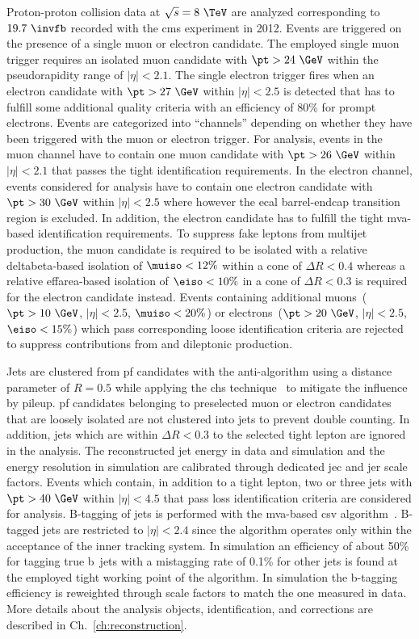 Proton-proton collision data at $\sqrt{s}=8~\TeV$ are analyzed corresponding to $19.7~\invfb$ recorded with the \gls{cms} experiment in 2012. Events are triggered on the presence of a single muon or electron candidate. The employed single muon trigger requires an isolated muon candidate with $\pt>24~\GeV$ within the pseudorapidity range of $|\eta|<2.1$. The single electron trigger fires when an electron candidate with $\pt>27~\GeV$ within $|\eta|<2.5$ is detected that has to fulfill some additional quality criteria with an efficiency of 80\% for prompt electrons. Events are categorized into ``channels'' depending on whether they have been triggered with the muon or electron trigger. For analysis, events in the muon channel have to contain one muon candidate with $\pt>26~\GeV$ within $|\eta|<2.1$ that passes the tight identification requirements. In the electron channel, events considered for analysis have to contain one electron candidate with $\pt>30~\GeV$ within $|\eta|<2.5$ where however the \gls{ecal} barrel-endcap transition region is excluded. In addition, the electron candidate has to fulfill the tight \gls{mva}-based identification requirements. To suppress fake leptons from multijet production, the muon candidate is required to be isolated with a relative \gls{deltabeta}-based isolation of $\muiso<12\%$ within a cone of $\Delta R<0.4$ whereas a relative \gls{effarea}-based isolation of $\eiso<10\%$ in a cone of $\Delta R <0.3$ is required for the electron candidate instead. Events containing additional muons~($\pt>10~\GeV$, $|\eta|<2.5$, $\muiso<20\%$) or electrons~($\pt>20~\GeV$, $|\eta|<2.5$, $\eiso<15\%$) which pass corresponding loose identification criteria are rejected to suppress contributions from \zjets and dileptonic \ttbar production. 

Jets are clustered from \gls{pf} candidates with the anti-\kt algorithm using a distance parameter of $R=0.5$ while applying the \gls{chs} technique~\cite{CMS-PAS-JME-14-001} to mitigate the influence by pileup. \gls{pf} candidates belonging to preselected muon or electron candidates that are loosely isolated are not clustered into jets to prevent double counting. In addition, jets which are within $\Delta R<0.3$ to the selected tight lepton are ignored in the analysis. The reconstructed jet energy in data and simulation and the energy resolution in simulation are calibrated through dedicated \gls{jec} and \gls{jer} scale factors. Events which contain, in addition to a tight lepton, two or three jets with $\pt>40~\GeV$ within $|\eta|<4.5$ that pass loss identification criteria are considered for analysis. B-tagging of jets is performed with the \gls{mva}-based \gls{csv} algorithm~\cite{Chatrchyan:2012jua}. B-tagged jets are restricted to $|\eta|<2.4$ since the algorithm operates only within the acceptance of the inner tracking system. In simulation an efficiency of about 50\% for tagging true b~jets with a mistagging rate of 0.1\% for other jets is found at the employed tight working point of the algorithm. In simulation the b-tagging efficiency is reweighted through scale factors to match the one measured in data. More details about the analysis objects, identification, and corrections are described in Ch.~\ref{ch:reconstruction}.

